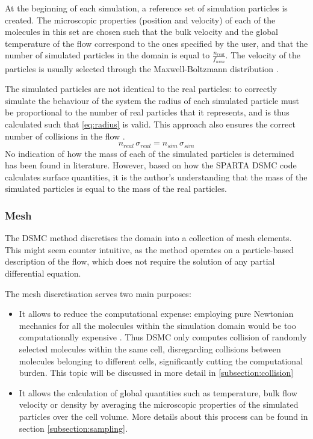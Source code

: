 At the beginning of each simulation, a reference set of simulation particles is created. The microscopic properties (position and velocity) of each of the molecules in this set are chosen such that the bulk velocity and the global temperature of the flow correspond to the ones specified by the user, and that the number of simulated particles in the domain is equal to $\frac{n_{real}}{f_{num}}$. The velocity of the particles is usually selected through the Maxwell-Boltzmann distribution \cite{natodsmc}.

The simulated particles are not identical to the real particles: to correctly simulate the behaviour of the system the radius of each simulated particle must be proportional to the number of real particles that it represents, and is thus calculated such that \autoref{eq:radius} is valid. This approach also ensures the correct number of collisions in the flow \cite{dsmcnotes}.
\begin{equation}
    n_{real}\, \sigma_{real} = n_{sim}\, \sigma_{sim}
    \label{eq:radius}
\end{equation}
No indication of how the mass of each of the simulated particles is determined has been found in literature. However, based on how the SPARTA DSMC code calculates surface quantities, it is the author's understanding that the mass of the simulated particles is equal to the mass of the real particles.

\subsubsection{Mesh}
The DSMC method discretises the domain into a collection of mesh elements. This might seem counter intuitive, as the method operates on a particle-based description of the flow, which does not require the solution of any partial differential equation.

The mesh discretisation serves two main purposes: 

\begin{itemize}
    \item It allows to reduce the computational expense: employing pure Newtonian mechanics for all the molecules within the simulation domain would be too computationally expensive \cite{themontecarlo}. Thus DSMC only computes collision of randomly selected molecules within the same cell, disregarding collisions between molecules belonging to different cells, significantly cutting the computational burden. This topic will be discussed in more detail in \autoref{subsection:collision}
    \item It allows the calculation of global quantities such as temperature, bulk flow velocity or density by averaging the microscopic properties of the simulated particles over the cell volume. More details about this process can be found in section \autoref{subsection:sampling}.
\end{itemize}

